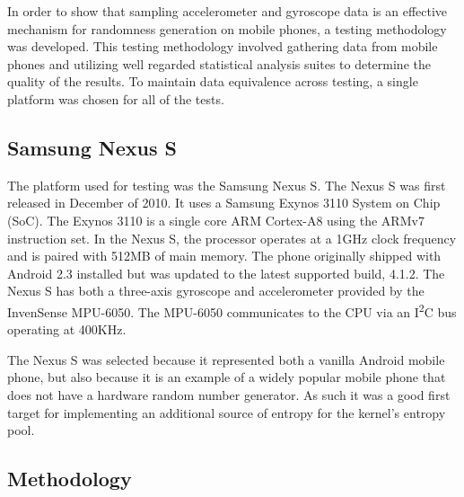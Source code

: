
In order to show that sampling accelerometer and gyroscope data is an effective
mechanism for randomness generation on mobile phones, a testing methodology was
developed. This testing methodology involved gathering data from mobile phones
and utilizing well regarded statistical analysis suites to determine the quality
of the results. To maintain data equivalence across testing, a single platform
was chosen for all of the tests. 

\subsection{Samsung Nexus S}

The platform used for testing was the Samsung Nexus S. The Nexus S was first
released in December of 2010. It uses a Samsung Exynos 3110 System on Chip
(SoC). The Exynos 3110 is a single core ARM Cortex-A8 using the ARMv7
instruction set. In the Nexus S, the processor operates at a 1GHz clock
frequency and is paired with 512MB of main memory. The phone originally shipped
with Android 2.3 installed but was updated to the latest supported build, 4.1.2.
The Nexus S has both a three-axis gyroscope and accelerometer provided by the
InvenSense MPU-6050. The MPU-6050 communicates to the CPU via an
I\textsuperscript{2}C bus operating at 400KHz. 

The Nexus S was selected because it represented both a vanilla Android mobile
phone, but also because it is an example of a widely popular mobile phone that
does not have a hardware random number generator. As such it was a good first
target for implementing an additional source of entropy for the kernel's entropy
pool.


\subsection{Methodology}

